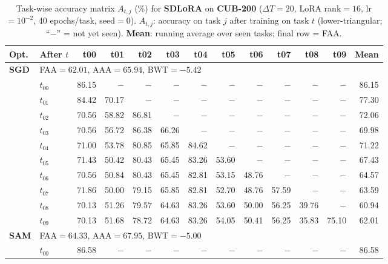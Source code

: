 \begin{table}[ht]
\centering
\caption{%
  Task-wise accuracy matrix $A_{t,j}$ (\%) for \textbf{SDLoRA} on \textbf{CUB-200} ($\Delta T=20$, LoRA rank$=16$, lr$=10^{-2}$, 40 epochs/task, seed$=0$).
  $A_{t,j}$: accuracy on task $j$ after training on task $t$  (lower-triangular; ``$-$'' = not yet seen).
  \textbf{Mean}: running average over seen tasks; final row = FAA.
}
\label{tab:raw_sdlora_cub200}
\setlength{\tabcolsep}{2.8pt}
\renewcommand{\arraystretch}{0.88}
\scriptsize
\begin{tabular}{@{}l l r r r r r r r r r r r@{}}
\toprule
\textbf{Opt.} & \textbf{After $t$} & \textbf{t00} & \textbf{t01} & \textbf{t02} & \textbf{t03} & \textbf{t04} & \textbf{t05} & \textbf{t06} & \textbf{t07} & \textbf{t08} & \textbf{t09} & \textbf{Mean} \\
\midrule
\multirow{11}{*}{\textbf{SGD}} & \multicolumn{12}{l}{\quad\small FAA$=62.01$,\; AAA$=65.94$,\; BWT$=-5.42$} \\
 & $t_{00}$ & 86.15 & $-$ & $-$ & $-$ & $-$ & $-$ & $-$ & $-$ & $-$ & $-$ & 86.15 \\
 & $t_{01}$ & 84.42 & 70.17 & $-$ & $-$ & $-$ & $-$ & $-$ & $-$ & $-$ & $-$ & 77.30 \\
 & $t_{02}$ & 70.56 & 58.82 & 86.81 & $-$ & $-$ & $-$ & $-$ & $-$ & $-$ & $-$ & 72.06 \\
 & $t_{03}$ & 70.56 & 56.72 & 86.38 & 66.26 & $-$ & $-$ & $-$ & $-$ & $-$ & $-$ & 69.98 \\
 & $t_{04}$ & 71.00 & 53.78 & 80.85 & 65.85 & 84.62 & $-$ & $-$ & $-$ & $-$ & $-$ & 71.22 \\
 & $t_{05}$ & 71.43 & 50.42 & 80.43 & 65.45 & 83.26 & 53.60 & $-$ & $-$ & $-$ & $-$ & 67.43 \\
 & $t_{06}$ & 70.56 & 50.84 & 80.43 & 65.45 & 82.81 & 53.15 & 48.76 & $-$ & $-$ & $-$ & 64.57 \\
 & $t_{07}$ & 71.86 & 50.00 & 79.15 & 65.85 & 82.81 & 52.70 & 48.76 & 57.59 & $-$ & $-$ & 63.59 \\
 & $t_{08}$ & 70.13 & 51.26 & 79.57 & 64.63 & 83.26 & 53.60 & 50.00 & 56.25 & 39.76 & $-$ & 60.94 \\
 & $t_{09}$ & 70.13 & 51.68 & 78.72 & 64.63 & 83.26 & 54.05 & 50.41 & 56.25 & 35.83 & 75.10 & 62.01 \\
\midrule
\multirow{11}{*}{\textbf{SAM}} & \multicolumn{12}{l}{\quad\small FAA$=64.33$,\; AAA$=67.95$,\; BWT$=-5.00$} \\
 & $t_{00}$ & 86.58 & $-$ & $-$ & $-$ & $-$ & $-$ & $-$ & $-$ & $-$ & $-$ & 86.58 \\

\end{tabular}
\end{table}
